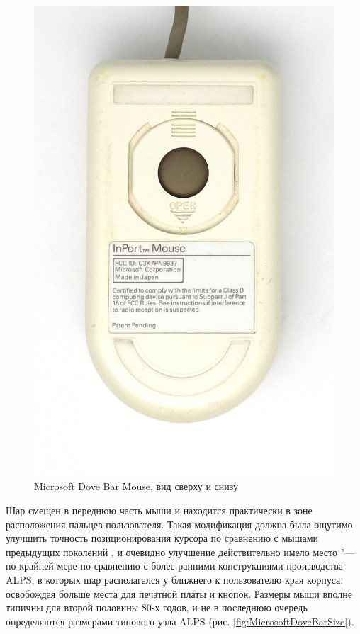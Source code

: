 \documentclass[11pt, a4paper]{article}
\begin{document}
\begin{figure}[h]
    \includegraphics[scale=0.5]{1987_microsoft_dove_bar_mouse/bottom_30.jpg}
    \caption{Microsoft Dove Bar Mouse, вид сверху и снизу}
    \label{fig:MicrosoftDoveBarTopAndBottom}
\end{figure}

Шар смещен в переднюю часть мыши и находится практически в зоне расположения пальцев пользователя. Такая модификация должна была ощутимо улучшить точность позиционирования курсора по сравнению с мышами предыдущих поколений \cite{atkinson}, и очевидно улучшение действительно имело место "--- по крайней мере по сравнению с более ранними конструкциями производства ALPS, в которых шар располагался у ближнего к пользователю края корпуса, освобождая больше места для печатной платы и кнопок. Размеры мыши вполне типичны для второй половины 80-х годов, и не в последнюю очередь определяются размерами типового узла ALPS (рис. \ref{fig:MicrosoftDoveBarSize}).
\end{document}
